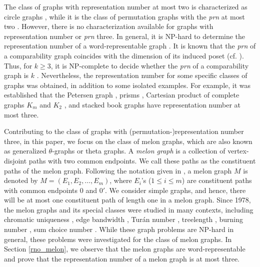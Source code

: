 \documentclass{llncs}
\begin{document}
The class of graphs with representation number at most two is characterized as circle graphs \cite{halldorsson11}, while it is the class of permutation graphs with the \textit{prn} at most two \cite{Baker_1972}. However, there is no characterization available for graphs with representation number or \textit{prn} three. In general, it is NP-hard to determine the  representation number of a word-representable graph \cite{kitaev15mono}. It is known that the \textit{prn} of a comparability graph coincides with the dimension of its induced poset (cf. \cite{Mozhui_Krishna_2025}). Thus, for $k \ge 3$, it is NP-complete to decide whether the \textit{prn} of a comparability graph is $k$  \cite{yanna82}. Nevertheless, the representation number for some specific classes of graphs was obtained, in addition to some isolated examples. For example, it was established that the Petersen graph \cite{kitaev15mono}, prisms \cite{kitaev13}, Cartesian product of complete graphs $K_m$ and $K_2$ \cite{broere_2019}, and stacked book graphs \cite{KM_KVK_ric} have representation number at most three. 

Contributing to the class of graphs with (permutation-)representation number three, in this paper, we focus on the class of melon graphs, which are also known as generalized $\theta$-graphs or theta graphs. A \textit{melon graph} is a collection of vertex-disjoint paths with two common endpoints. We call these paths as the constituent paths of the melon graph. Following the notation given in \cite{dissaux}, a melon graph $M$ is denoted by $M = (E_1, E_2, \ldots, E_m)$, where $E_i$'s ($1 \le i \le m$) are constituent paths with common endpoints $0$ and $0'$. We consider simple graphs, and hence, there will be at most one constituent path of length one in a melon graph.
Since 1978, the melon graphs and its special classes were studied in many contexts, including chromatic uniqueness \cite{Loerinc_1978}, edge bandwidth \cite{Dennis_2000}, Tur\'{a}n number \cite{Liu_2023,Zhai_2021}, treelength \cite{dissaux}, burning number \cite{Liu_zhang_2019}, sum choice number \cite{Brause_2017,Carraher_2015}. While these graph problems are NP-hard in general, these problems were investigated for the class of melon graphs. In Section \ref{rno_melon}, we observe that the melon graphs are word-representable and prove that the representation number of a melon graph is at most three.
\end{document}
